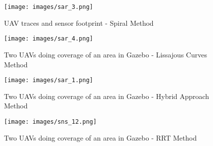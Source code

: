 \begin{figure}[htbp]

  \texttt{[image: images/sar\_3.png]}
  \caption{UAV traces and sensor footprint - Spiral Method}\label{fig:sfs989} 
\end{figure}

\begin{figure}[htbp]
  \texttt{[image: images/sar\_4.png]}
  \caption{Two UAVs doing coverage of an area in Gazebo - Lissajous Curves Method}\label{fig:sflc188} 
\end{figure}

\begin{figure}[htbp]

  \texttt{[image: images/sar\_1.png]}
  \caption{Two UAVs doing coverage of an area in Gazebo - Hybrid Approach Method}\label{fig:sfsl77} 
\end{figure}

\begin{figure}[htbp]
  \texttt{[image: images/sns\_12.png]}
  \caption{Two UAVs doing coverage of an area in Gazebo - RRT Method}\label{fig:sfrrt56}
\end{figure}









